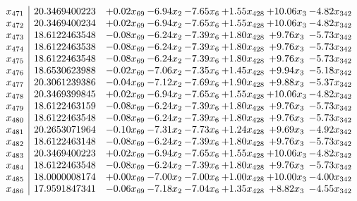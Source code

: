 \documentclass[8pt]{article}
\begin{document}
\[\begin{array}{c| c c@{\hskip 2pt} c@{\hskip 2pt} c@{\hskip 2pt} c@{\hskip 2pt} c@{\hskip 2pt} c@{\hskip 2pt} }
 x_{471}   &  20.3469400223 & +  0.02 x_{69} & -6.94 x_{2} & -7.65 x_{6} & +  1.55 x_{428} & + 10.06 x_{3} & -4.82 x_{342}\\
 x_{472}   &  20.3469400234 & +  0.02 x_{69} & -6.94 x_{2} & -7.65 x_{6} & +  1.55 x_{428} & + 10.06 x_{3} & -4.82 x_{342}\\
 x_{473}   &  18.6122463548 & -0.08 x_{69} & -6.24 x_{2} & -7.39 x_{6} & +  1.80 x_{428} & +  9.76 x_{3} & -5.73 x_{342}\\
 x_{474}   &  18.6122463538 & -0.08 x_{69} & -6.24 x_{2} & -7.39 x_{6} & +  1.80 x_{428} & +  9.76 x_{3} & -5.73 x_{342}\\
 x_{475}   &  18.6122463548 & -0.08 x_{69} & -6.24 x_{2} & -7.39 x_{6} & +  1.80 x_{428} & +  9.76 x_{3} & -5.73 x_{342}\\
 x_{476}   &  18.6530623988 & -0.02 x_{69} & -7.06 x_{2} & -7.35 x_{6} & +  1.45 x_{428} & +  9.94 x_{3} & -5.18 x_{342}\\
 x_{477}   &  20.3061239386 & -0.04 x_{69} & -7.12 x_{2} & -7.69 x_{6} & +  1.90 x_{428} & +  9.88 x_{3} & -5.37 x_{342}\\
 x_{478}   &  20.3469399845 & +  0.02 x_{69} & -6.94 x_{2} & -7.65 x_{6} & +  1.55 x_{428} & + 10.06 x_{3} & -4.82 x_{342}\\
 x_{479}   &  18.6122463159 & -0.08 x_{69} & -6.24 x_{2} & -7.39 x_{6} & +  1.80 x_{428} & +  9.76 x_{3} & -5.73 x_{342}\\
 x_{480}   &  18.6122463548 & -0.08 x_{69} & -6.24 x_{2} & -7.39 x_{6} & +  1.80 x_{428} & +  9.76 x_{3} & -5.73 x_{342}\\
 x_{481}   &  20.2653071964 & -0.10 x_{69} & -7.31 x_{2} & -7.73 x_{6} & +  1.24 x_{428} & +  9.69 x_{3} & -4.92 x_{342}\\
 x_{482}   &  18.6122463148 & -0.08 x_{69} & -6.24 x_{2} & -7.39 x_{6} & +  1.80 x_{428} & +  9.76 x_{3} & -5.73 x_{342}\\
 x_{483}   &  20.3469400223 & +  0.02 x_{69} & -6.94 x_{2} & -7.65 x_{6} & +  1.55 x_{428} & + 10.06 x_{3} & -4.82 x_{342}\\
 x_{484}   &  18.6122463548 & -0.08 x_{69} & -6.24 x_{2} & -7.39 x_{6} & +  1.80 x_{428} & +  9.76 x_{3} & -5.73 x_{342}\\
 x_{485}   &  18.0000008174 & +  0.00 x_{69} & -7.00 x_{2} & -7.00 x_{6} & +  1.00 x_{428} & + 10.00 x_{3} & -4.00 x_{342}\\
 x_{486}   &  17.9591847341 & -0.06 x_{69} & -7.18 x_{2} & -7.04 x_{6} & +  1.35 x_{428} & +  8.82 x_{3} & -4.55 x_{342}\\

\end{array}\]
\end{document}
